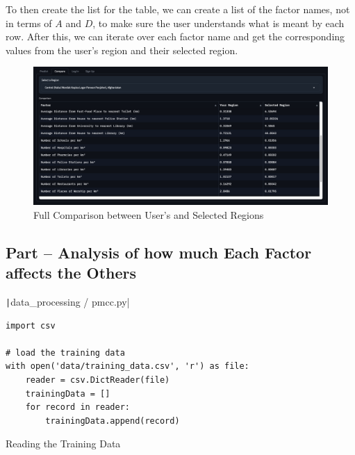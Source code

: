 \documentclass[12pt]{report}
\newcommand{\pil}[1]{\protect\texttt|#1|}
\begin{document}
To then create the list for the table, we can create a list of the factor names, not in terms of $A$ and $D$, to make sure the user understands what is meant by each row. After this, we can iterate over each factor name and get the corresponding values from the user's region and their selected region.

\begin{figure}[H]
\centering
\includegraphics[width=14cm]{ss17.5.png}
\caption{Full Comparison between User's and Selected Regions}\label{fig:ss17.5}
\end{figure}

\begin{center}
\end{center}

\subsection{Part \theparts{} -- Analysis of how much Each Factor affects the Others}

\begin{listing}[H]
\pil{data_processing / pmcc.py}
\begin{verbatim}
import csv

# load the training data
with open('data/training_data.csv', 'r') as file:
    reader = csv.DictReader(file)
    trainingData = []
    for record in reader:
        trainingData.append(record)
\end{verbatim}
\caption{Reading the Training Data}\label{cs:readTraining}
\end{listing}
\end{document}
